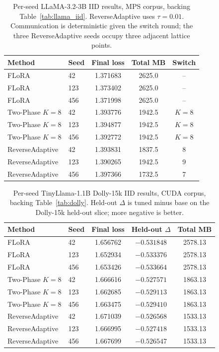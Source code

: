\begin{table}[!t]
\caption{Per-seed LLaMA-3.2-3B IID results, MPS corpus, backing Table~\ref{tab:llama_iid}. ReverseAdaptive uses $\tau{=}0.01$. Communication is deterministic given the switch round; the three ReverseAdaptive seeds occupy three adjacent lattice points.}
\label{tab:b3}
\begin{center}
\small
\setlength{\tabcolsep}{5pt}
\begin{tabular}{llccc}
\toprule
Method & Seed & Final loss & Total MB & Switch \\
\midrule
FLoRA & 42 & 1.371683 & 2625.0 & -- \\
FLoRA & 123 & 1.373402 & 2625.0 & -- \\
FLoRA & 456 & 1.371998 & 2625.0 & -- \\
Two-Phase $K{=}8$ & 42 & 1.393776 & 1942.5 & $K{=}8$ \\
Two-Phase $K{=}8$ & 123 & 1.394877 & 1942.5 & $K{=}8$ \\
Two-Phase $K{=}8$ & 456 & 1.392772 & 1942.5 & $K{=}8$ \\
ReverseAdaptive & 42 & 1.393831 & 1837.5 & 8 \\
ReverseAdaptive & 123 & 1.390265 & 1942.5 & 9 \\
ReverseAdaptive & 456 & 1.397366 & 1732.5 & 7 \\
\bottomrule
\end{tabular}
\end{center}
\end{table}

\begin{table}[!t]
\caption{Per-seed TinyLlama-1.1B Dolly-15k IID results, CUDA corpus, backing Table~\ref{tab:dolly}. Held-out $\Delta$ is tuned minus base on the Dolly-15k held-out slice; more negative is better.}
\label{tab:b4}
\begin{center}
\small
\setlength{\tabcolsep}{5pt}
\begin{tabular}{llccc}
\toprule
Method & Seed & Final loss & Held-out $\Delta$ & Total MB \\
\midrule
FLoRA & 42 & 1.656762 & $-0.531848$ & 2578.13 \\
FLoRA & 123 & 1.652934 & $-0.533376$ & 2578.13 \\
FLoRA & 456 & 1.653426 & $-0.533664$ & 2578.13 \\
Two-Phase $K{=}8$ & 42 & 1.666616 & $-0.527571$ & 1863.13 \\
Two-Phase $K{=}8$ & 123 & 1.662685 & $-0.529113$ & 1863.13 \\
Two-Phase $K{=}8$ & 456 & 1.663475 & $-0.529410$ & 1863.13 \\
ReverseAdaptive & 42 & 1.671039 & $-0.526568$ & 1533.13 \\
ReverseAdaptive & 123 & 1.666995 & $-0.527418$ & 1533.13 \\
ReverseAdaptive & 456 & 1.667699 & $-0.526547$ & 1533.13 \\
\bottomrule
\end{tabular}
\end{center}
\end{table}



